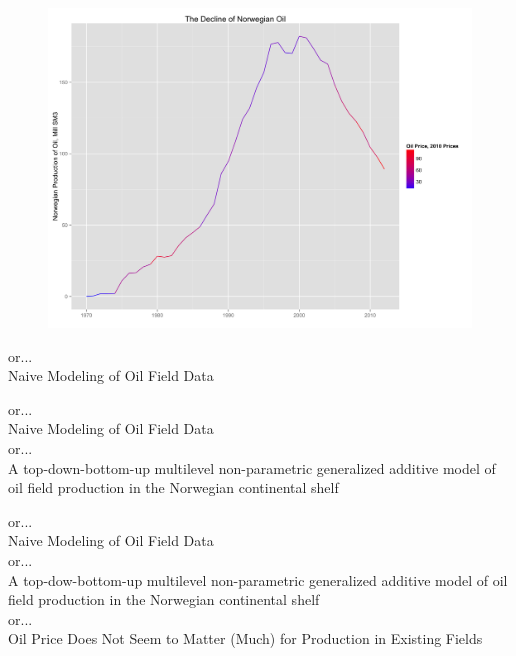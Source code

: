 \documentclass{beamer}
\begin{document}

\begin{frame}[plain]
	\begin{figure}
	\includegraphics[width=1\textwidth]{oil_decline.png}
	\end{figure}
\end{frame}


\begin{frame}[plain]
or...\\
Naive Modeling of Oil Field Data
\end{frame}

\begin{frame}[plain]
or...\\
Naive Modeling of Oil Field Data\\[1cm]
or...\\
A top-down-bottom-up multilevel non-parametric generalized additive model of oil field production in the Norwegian continental shelf\\
\end{frame}

\begin{frame}[plain]
or...\\
Naive Modeling of Oil Field Data\\[1cm]
or...\\
A top-dow-bottom-up multilevel non-parametric generalized additive model of oil field production in the Norwegian continental shelf\\[1cm]
or...\\
Oil Price Does Not Seem to Matter (Much) for Production in Existing Fields\\
\end{frame}
\end{document}
